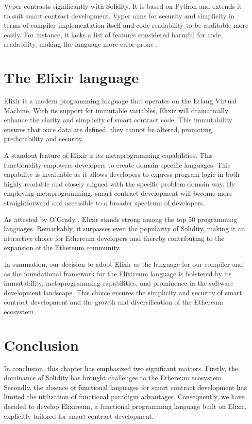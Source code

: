 Vyper contrasts significantly with Solidity. It is based on Python and extends it to suit smart contract development. Vyper aims for security and simplicity in terms of compiler implementation itself and code readability to be auditable more easily. For instance, it lacks a list of features considered harmful for code readability, making the language more error-prone \cite{VyperDescription}.

\section{The Elixir language}
\label{sec:ex}

Elixir \cite{ElixirOfficialWebSite} is a modern programming language that operates on the Erlang Virtual Machine. With its support for immutable variables, Elixir will dramatically enhance the clarity and simplicity of smart contract code. This immutability ensures that once data are defined, they cannot be altered, promoting predictability and security.

A standout feature of Elixir is its metaprogramming capabilities. This functionality empowers developers to create domain-specific languages. This capability is invaluable as it allows developers to express program logic in both highly readable and closely aligned with the specific problem domain way. By employing metaprogramming, smart contract development will become more straightforward and accessible to a broader spectrum of developers.

As attested by O'Grady \cite{RedMonk}, Elixir stands strong among the top 50 programming languages. Remarkably, it surpasses even the popularity of Solidity, making it an attractive choice for Ethereum developers and thereby contributing to the expansion of the Ethereum community.

In summation, our decision to adopt Elixir as the language for our compiler and as the foundational framework for the Elixireum language is bolstered by its immutability, metaprogramming capabilities, and prominence in the software development landscape. This choice ensures the simplicity and security of smart contract development and the growth and diversification of the Ethereum ecosystem.

\section{Conclusion}
\label{sec:conc}

In conclusion, this chapter has emphasized two significant matters. Firstly, the dominance of Solidity has brought challenges to the Ethereum ecosystem. Secondly, the absence of functional languages for smart contract development has limited the utilization of functional paradigm advantages. Consequently, we have decided to develop Elixireum, a functional programming language built on Elixir, explicitly tailored for smart contract development.

